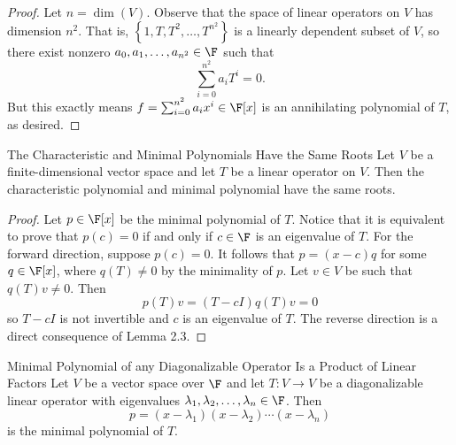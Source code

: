 \documentclass[linearalgebraII]{subfiles}
\begin{document}
    \begin{proof}
        Let $n = \dim(V)$. Observe that the space of linear operators on $V$ has dimension $n^2$. That is, $\left\lbrace 1, T, T^2, \ldots, T^{n^2} \right\rbrace$ is a linearly dependent subset of $V$, so there exist nonzero $a_0, a_1, \ldots, a_{n^2}\in \F$ such that
        \begin{equation*}
            \sum^{n^2}_{i=0} a_iT^i = 0.
        \end{equation*}
        But this exactly means $f = \sum^{n^2}_{i=0} a_ix^i\in\F[x]$ is an annihilating polynomial of $T$, as desired.
    \end{proof}

    \clearpage
    \begin{lemma}{The Characteristic and Minimal Polynomials Have the Same Roots}
        Let $V$ be a finite-dimensional vector space and let $T$ be a linear operator on $V$. Then the characteristic polynomial and minimal polynomial have the same roots.
    \end{lemma}

    \begin{proof}
        Let $p\in\F[x]$ be the minimal polynomial of $T$. Notice that it is equivalent to prove that $p(c) = 0$ if and only if $c\in \F$ is an eigenvalue of $T$. For the forward direction, suppose $p(c) = 0$. It follows that $p = (x-c)q$ for some $q\in\F[x]$, where $q(T)\neq 0$ by the minimality of $p$. Let $v\in V$ be such that $q(T)v\neq 0$. Then
        \begin{equation*}
            p(T)v = (T-cI)q(T)v = 0
        \end{equation*}
        so $T-cI$ is not invertible and $c$ is an eigenvalue of $T$. The reverse direction is a direct consequence of Lemma 2.3.
    \end{proof}

    \begin{prop}{Minimal Polynomial of any Diagonalizable Operator Is a Product of Linear Factors}
        Let $V$ be a vector space over $\F$ and let $T:V\to V$ be a diagonalizable linear operator with eigenvalues $\lambda_1, \lambda_2, \ldots, \lambda_n\\ \in \F$. Then
        \begin{equation*}
            p = (x-\lambda_1)(x-\lambda_2)\cdots(x-\lambda_n)
        \end{equation*}
        is the minimal polynomial of $T$.
    \end{prop}
\end{document}
